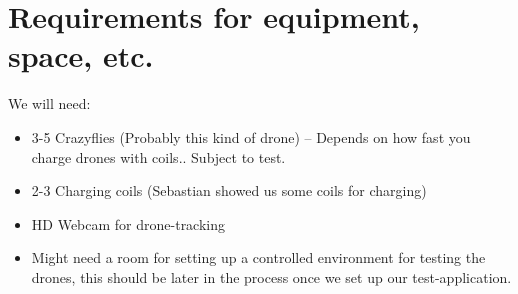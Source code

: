 \documentclass[11pt]{article} %
\begin{document}
\section{Requirements for equipment, space, etc.}
We will need:
\begin{itemize}
\item 3-5 Crazyflies (Probably this kind of drone) -- Depends on how fast you charge drones with coils.. Subject to test.
\item 2-3 Charging coils (Sebastian showed us some coils for charging)
\item HD Webcam for drone-tracking
\item Might need a room for setting up a controlled environment for testing the drones, this should be later in the process once we set up our test-application.
\end{itemize}
\end{document}
